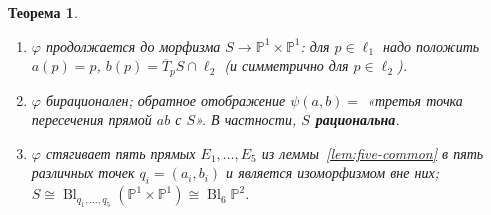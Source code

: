 \documentclass[11pt,a4paper]{article}
\theoremstyle{plain}
\newtheorem{theorem}{Теорема}[section]
\theoremstyle{definition}
\theoremstyle{remark}
\newcommand{\PP}{\mathbb{P}}
\DeclareMathOperator{\Bl}{Bl}
\begin{document}
\begin{theorem}\label{thm:projection}
\begin{enumerate}
\item $\varphi$ продолжается до морфизма $S\to\PP^1\times\PP^1$: для $p\in\ell_1$ надо положить
$a(p)=p$, $b(p)=\overline T_pS\cap\ell_2$ (и симметрично для $p\in\ell_2$).
\item $\varphi$ бирационален; обратное отображение $\psi(a,b)=$ «третья точка пересечения прямой $ab$ с $S$».
В частности, \textbf{$S$ рациональна}.
\item $\varphi$ стягивает пять прямых $E_1,\dots,E_5$ из леммы~\ref{lem:five-common} в пять различных точек
$q_i=(a_i,b_i)$ и является изоморфизмом вне них; $S\cong\Bl_{q_1,\dots,q_5}(\PP^1\times\PP^1)\cong\Bl_6\PP^2$.
\end{enumerate}
\end{theorem}
\end{document}
